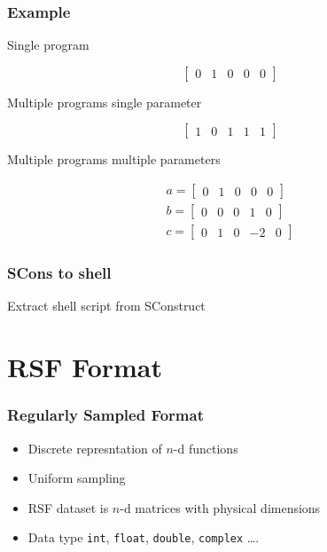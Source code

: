 \begin{frame}
  \frametitle{Example}
  Single program
  
  \begin{equation*}
    \begin{bmatrix} 0 & 1 & 0 & 0 & 0 \end{bmatrix}
  \end{equation*}

  \pause
  Multiple programs single parameter
  
  \begin{equation*}
    \begin{bmatrix} 1 & 0 & 1 & 1 & 1 \end{bmatrix}
  \end{equation*}

  \pause
  Multiple programs multiple parameters
  
  \begin{gather*}
    a = \begin{bmatrix} 0 & 1 & 0 & 0 & 0 \end{bmatrix} \\
    b = \begin{bmatrix} 0 & 0 & 0 & 1 & 0 \end{bmatrix} \\
    c = \begin{bmatrix} 0 & 1 & 0 & -2 & 0 \end{bmatrix}
  \end{gather*}
\end{frame}

\begin{frame}
  \frametitle{SCons to shell}

  \begin{block}{Extract shell script from SConstruct}
  \end{block}
  
  
  
\end{frame}

\section{RSF Format}

\begin{frame}
  \frametitle{Regularly Sampled Format}

  \begin{itemize}
  \item Discrete represntation of $n$-d functions
  \item Uniform sampling
  \item RSF dataset is $n$-d matrices with physical dimensions
  \item Data type \texttt{int}, \texttt{float}, \texttt{double}, \texttt{complex} \ldots.
  \end{itemize}
\end{frame}


